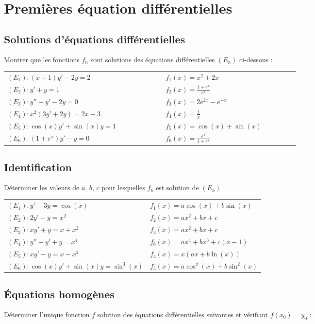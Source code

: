 \documentclass[oneside,12pt]{article}          %
\begin{document}
 
\section{Premières équation différentielles}


\subsection{Solutions d'équations différentielles}
Montrer que les fonctions $f_n$ sont solutions des équations différentielles $(E_n)$ ci-dessous :

\renewcommand{\arraystretch}{1.5}
\begin{tabular}{p{0.4\linewidth}p{0.3\linewidth}}
    $(E_1):(x+1)y'-2y=2$ & $f_1(x)=x^2+2x$\\
    $(E_2):y'+y=1$ & $f_2(x)=\frac{1+e^x}{e^x}$ \\
    $(E_3):y''-y'-2y=0$ & $f_3(x)=2e^{2x}-e^{-x}$\\
    $(E_4):x^2(3y'+2y)=2x-3$ & $f_4(x)=\frac{1}{x}$ \\
    $(E_5):\cos(x)y'+\sin(x)y=1$ & $f_5(x)=\cos(x)+\sin(x)$ \\
    $(E_6):(1+e^x)y'-y=0$ & $f_6(x)=\frac{e^x}{1+e^x}$
\end{tabular}



\subsection{Identification}
Déterminer les valeurs de $a$, $b$, $c$ pour lesquelles $f_k$ est solution de $(E_k)$ 

\begin{tabular}{ll}
$(E_1) : y' - 3y = \cos(x)$ & $f_1(x) = a \cos(x) + b \sin(x)$ \\
$(E_2) : 2y' + y = x^2$ & $f_2(x) = a x^2 + b x + c$ \\
$(E_3) : xy'+y=x+x^2$ & $f_3(x) = a x^2 + b x + c$ \\
$(E_4) : y''+y'+y=x^4$ & $f_6(x) = ax^4+bx^3+c(x-1)$\\
$(E_5) : xy'-y=x-x^2$ & $f_4(x) = x (ax + b \ln(x))$ \\
$(E_6) : \cos(x)y'+\sin(x)y=\sin^3(x)$ & $f_5(x) = a \cos^2(x) + b \sin^2(x)$ \\
\end{tabular}



\subsection{Équations homogènes}
  Déterminer l'unique fonction $f$ solution des équations différentielles suivantes et vérifiant $f(x_0)=y_0$ :
\end{document}
